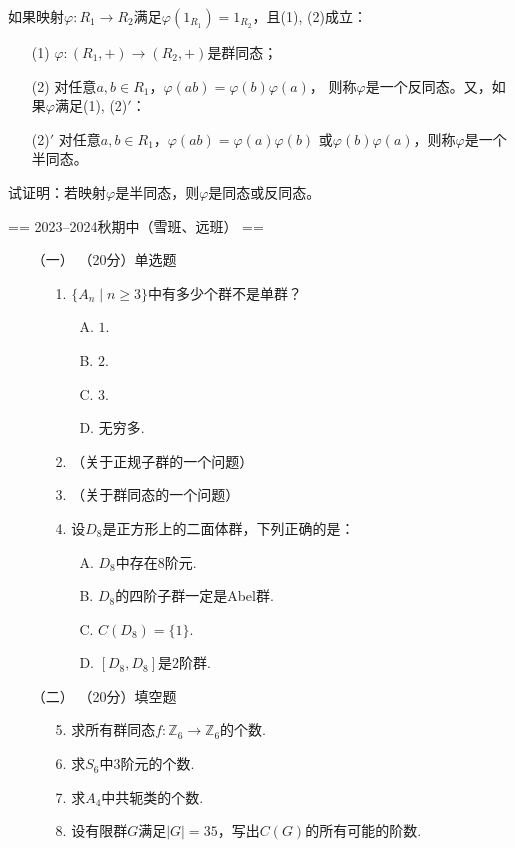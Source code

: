 \begin{itemize}
    如果映射$\varphi:R_1\to R_2$满足$\varphi(1_{R_1})=1_{R_2}$，且(1), (2)成立：
    \begin{itemize}
        \item[(1)]$\varphi:(R_1,+)\to(R_2,+)$是群同态；
        \item[(2)]对任意$a,b\in R_1$，$\varphi(ab)=\varphi(b)\varphi(a)$，
        则称$\varphi$是一个反同态。又，如果$\varphi$满足(1), (2)$'$：
        \item[(2)$'$]对任意$a,b\in R_1$，$\varphi(ab)=\varphi(a)\varphi(b)$
        或$\varphi(b)\varphi(a)$，则称$\varphi$是一个半同态。
    \end{itemize}
    试证明：若映射$\varphi$是半同态，则$\varphi$是同态或反同态。
\end{itemize}

== 2023--2024秋期中（雪班、远班） ==
\begin{itemize}
\item[（一）]（20分）单选题
\begin{itemize}
\item[1.] $\{A_n \mid n\geqslant 3\}$中有多少个群不是单群？
\begin{itemize}
    \item[A.] $1$.
    \item[B.] $2$.
    \item[C.] $3$.
    \item[D.] 无穷多.
\end{itemize}
\item[2.] （关于正规子群的一个问题）
\item[3.] （关于群同态的一个问题）
\item[4.] 设$D_8$是正方形上的二面体群，下列正确的是：
\begin{itemize}
    \item[A.] $D_8$中存在$8$阶元.
    \item[B.] $D_8$的四阶子群一定是Abel群.
    \item[C.] $C(D_8)=\{1\}$.
    \item[D.] $[D_8,D_8]$是$2$阶群.
\end{itemize}
\end{itemize}

\item[（二）]（20分）填空题
\begin{itemize}
\item[5.] 求所有群同态$f:\mathbb{Z}_6\to\mathbb{Z}_6$的个数.
\item[6.] 求$S_6$中$3$阶元的个数.
\item[7.] 求$A_4$中共轭类的个数.
\item[8.] 设有限群$G$满足$|G|=35$，写出$C(G)$的所有可能的阶数.
\end{itemize}


\end{itemize}
